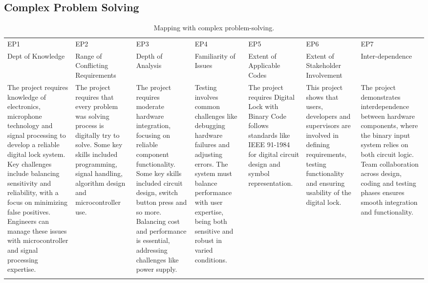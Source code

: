 \begin{center}
    \begin{table}[ht]
    \subsection{Complex Problem Solving} 
        \begin{tabular}{|p{}|p{}|p{}|p{}|p{}|p{}|p{}|}
        \hline
        EP1& EP2& EP3& EP4& EP5& EP6& EP7\\
        Dept of Knowledge & Range of Conflicting Requirements & Depth of Analysis & Familiarity of Issues & Extent of Applicable Codes & Extent of Stakeholder Involvement & Inter-dependence\\
        \hline 
         The project requires knowledge of electronics, microphone technology and signal processing to develop a reliable digital lock system. Key challenges include balancing sensitivity and reliability, with a focus on minimizing false positives. Engineers can manage these issues with microcontroller and signal processing expertise.
&The project requires that every problem was solving process is digitally try to solve. Some key skills included programming, signal handling, algorithm design and microcontroller use.
 &The project requires moderate hardware integration, focusing on reliable component functionality.  Some key skills included circuit design, switch button press and so more. Balancing cost and performance is essential, addressing challenges like power supply.
&Testing involves common challenges like debugging hardware failures and adjusting errors. The system must balance performance with user expertise, being both sensitive and robust in varied conditions. 
&The project requires Digital Lock with Binary Code follows standards like IEEE 91-1984 for digital circuit design and symbol representation. 
&This project shows that users, developers and supervisors are involved in defining requirements, testing functionality and ensuring usability of the digital lock. 
&The project demonstrates interdependence between hardware components, where the binary input system relies on both circuit logic. Team collaboration across design, coding and testing phases ensures smooth integration and functionality.\\
        &&&&&&\\
        \hline 
        \end{tabular}
         \centering
        \caption{Mapping with complex problem-solving.}
        \label{tab:p_solve}
    \end{table}
     
\end{center}

